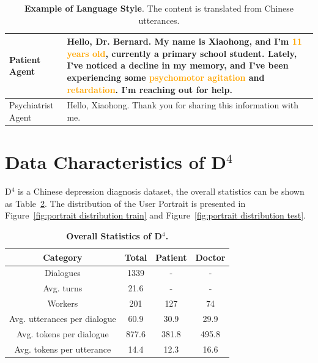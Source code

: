 \begin{table}[!h]
    \centering
    \begin{tabular}{m{2cm}m{6cm}}
    \toprule
         Patient Agent & Hello, Dr. Bernard. My name is Xiaohong, and I’m \textcolor{orange}{11 years old}, currently a primary school student. Lately, I've noticed a decline in my memory, and I've been experiencing some \textcolor{orange}{psychomotor agitation} and \textcolor{orange}{retardation}. I’m reaching out for help. \\
    \midrule
         Psychiatrist Agent & Hello, Xiaohong. Thank you for sharing this information with me. \\
    \bottomrule
    \end{tabular}
    \caption{\textbf{Example of Language Style}. The content is translated from Chinese utterances.}
    \label{tab:language style}
\end{table}


\section{Data Characteristics of D$^4$}
D$^4$ is a Chinese depression diagnosis dataset, the overall statistics can be shown as Table~\ref{tab:data characteristic}. The distribution of the User Portrait is presented in Figure~\ref{fig:portrait distribution train} and Figure~\ref{fig:portrait distribution test}.

\begin{table}[htbp]
    \centering
    \small
    \begin{tabular}{cccc}
    \toprule
    \textbf{Category}&\textbf{Total}&\textbf{Patient}&\textbf{Doctor} \\
    \midrule
        Dialogues & 1339 & - & - \\
    \midrule
        Avg. turns & 21.6 & - & - \\
    \midrule
        Workers & 201 & 127 & 74 \\
    \midrule
        Avg. utterances per dialogue & 60.9 & 30.9 & 29.9 \\
    \midrule
        Avg. tokens per dialogue & 877.6 & 381.8 & 495.8 \\
    \midrule
        Avg. tokens per utterance & 14.4 & 12.3 & 16.6 \\
    \bottomrule
    \end{tabular}
    \caption{\textbf{Overall Statistics of D$^4$.}}
    \label{tab:data characteristic}
\end{table}

